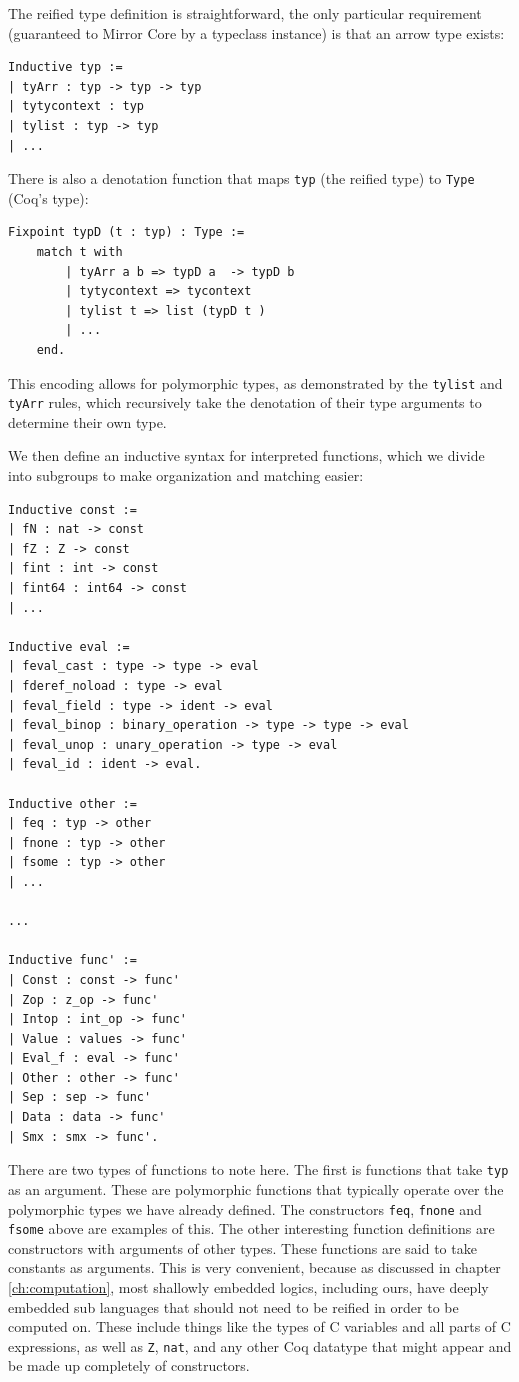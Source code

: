 \documentclass{puthesis}
\begin{document}
The reified type definition is straightforward, the only particular
requirement (guaranteed to Mirror Core by a typeclass instance) is
that an arrow type exists:

\begin{lstlisting}
Inductive typ :=
| tyArr : typ -> typ -> typ
| tytycontext : typ
| tylist : typ -> typ
| ...
\end{lstlisting}

There is also a denotation function that maps \lstinline|typ| (the
reified type) to \lstinline|Type| (Coq's type):

\begin{lstlisting} 
Fixpoint typD (t : typ) : Type :=
    match t with
        | tyArr a b => typD a  -> typD b
        | tytycontext => tycontext
        | tylist t => list (typD t )
        | ...
    end.
\end{lstlisting}

This encoding allows for polymorphic types, as demonstrated by the
\lstinline|tylist| and \lstinline|tyArr| rules, which recursively take
the denotation of their type arguments to determine their own
type.

We then define an inductive syntax for interpreted functions, which we
divide into subgroups to make organization and matching easier:

\begin{lstlisting}
Inductive const :=
| fN : nat -> const
| fZ : Z -> const
| fint : int -> const
| fint64 : int64 -> const
| ...

Inductive eval :=
| feval_cast : type -> type -> eval
| fderef_noload : type -> eval
| feval_field : type -> ident -> eval
| feval_binop : binary_operation -> type -> type -> eval
| feval_unop : unary_operation -> type -> eval
| feval_id : ident -> eval.

Inductive other :=
| feq : typ -> other
| fnone : typ -> other
| fsome : typ -> other
| ...

...

Inductive func' :=
| Const : const -> func'
| Zop : z_op -> func'
| Intop : int_op -> func'
| Value : values -> func'
| Eval_f : eval -> func'
| Other : other -> func'
| Sep : sep -> func'
| Data : data -> func'
| Smx : smx -> func'.

\end{lstlisting}

There are two types of functions to note here. The first is functions
that take \lstinline|typ| as an argument. These are polymorphic
functions that typically operate over the polymorphic types we have
already defined. The constructors \lstinline|feq|, \lstinline|fnone|
and \lstinline|fsome| above are examples of this. The other
interesting function definitions are constructors with arguments of
other types. These functions are said to take constants as
arguments. This is very convenient, because as discussed in chapter
\ref{ch:computation}, most shallowly embedded logics, including ours,
have deeply embedded sub languages that should not need to be reified
in order to be computed on. These include things like the types of C
variables and all parts of C expressions, as well as \lstinline|Z|,
\lstinline|nat|, and any other Coq datatype that might appear and be
made up completely of constructors.
\end{document}
